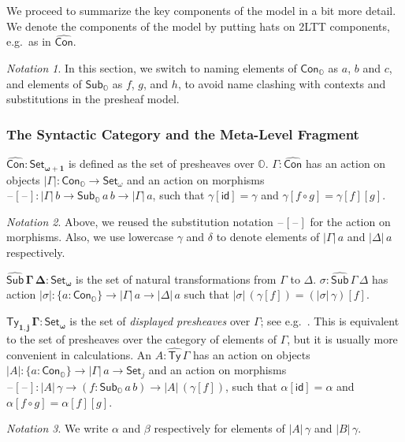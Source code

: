 \documentclass[acmsmall,screen]{acmart}
\newcommand{\msf}[1]{\mathsf{#1}}
\newcommand{\mbb}[1]{\mathbb{#1}}
\newcommand{\bs}[1]{\boldsymbol{#1}}
\newcommand{\wh}[1]{\widehat{#1}}
\newcommand{\mbbo}{\mbb{O}}
\newcommand{\Con}{\msf{Con}}
\newcommand{\Cono}{\msf{Con}_{\mbbo}}
\newcommand{\Subo}{\msf{Sub}_{\mbbo}}
\newcommand{\hCon}{\wh{\msf{Con}}}
\newcommand{\hSub}{\wh{\msf{Sub}}}
\newcommand{\hTy}{\wh{\msf{Ty}}}
\newcommand{\id}{\msf{id}}
\newcommand{\Set}{\mathsf{Set}}
\newcommand{\blank}{{\mathord{\hspace{1pt}\text{--}\hspace{1pt}}}}
\theoremstyle{remark}
\newtheorem{notation}{Notation}
\begin{document}
We proceed to summarize the key components of the model in a bit more detail. We
denote the components of the model by putting hats on 2LTT components, e.g.\ as
in $\hCon$.

\begin{notation}
In this section, we switch to naming elements of $\Cono$ as $a$, $b$ and $c$,
and elements of $\Subo$ as $f$, $g$, and $h$, to avoid name clashing with
contexts and substitutions in the presheaf model.
\end{notation}

\subsubsection{The Syntactic Category and the Meta-Level Fragment}

\begin{definition} $\bs{\wh{\Con} : \Set_{\omega+1}}$ is defined as the set of presheaves
over $\mbbo$. $\Gamma : \wh{\Con}$ has an action on objects $|\Gamma| :
\Cono \to \Set_\omega$ and an action on morphisms $\blank[\blank] : |\Gamma|\,b
\to \Subo\,a\,b \to |\Gamma|\,a$, such that $\gamma[\id] = \gamma$ and
$\gamma[f\circ g] = \gamma[f][g]$.

\begin{notation}
Above, we reused the substitution notation $\blank[\blank]$ for the action on
morphisms.  Also, we use lowercase $\gamma$ and $\delta$ to denote elements of
$|\Gamma|\,a$ and $|\Delta|\,a$ respectively.
\end{notation}

\end{definition}
\begin{definition} $\bs{\hSub\,\Gamma\,\Delta : \Set_\omega}$ is the set of natural transformations
from $\Gamma$ to $\Delta$. $\sigma : \hSub\,\Gamma\,\Delta$ has action
$|\sigma| : \{a : \Cono\} \to |\Gamma|\,a \to |\Delta|\,a$ such that
$|\sigma|\,(\gamma[f]) = (|\sigma|\,\gamma)[f]$.
\end{definition}

\begin{definition}
$\bs{\hTy_{1,j}\,\Gamma : \Set_\omega}$ is the set of \emph{displayed
presheaves} over $\Gamma$; see e.g.\ \cite[Chapter~1.2]{huber-thesis}. This is
equivalent to the set of presheaves over the category of elements of $\Gamma$,
but it is usually more convenient in calculations. An $A : \hTy\,\Gamma$ has
an action on objects $|A| : \{a : \Cono\} \to |\Gamma|\,a \to \Set_j$ and an
action on morphisms $\blank[\blank] : |A|\,\gamma \to (f : \Subo\,a\,b) \to
|A|\,(\gamma[f])$, such that $\alpha[\id] = \alpha$ and $\alpha[f \circ g] =
\alpha[f][g]$.

\begin{notation}
  We write $\alpha$ and $\beta$ respectively for elements of $|A|\,\gamma$ and
  $|B|\,\gamma$.
\end{notation}
\end{definition}
\end{document}

